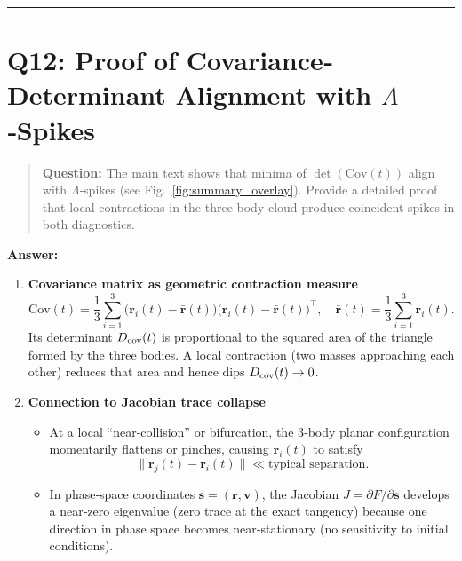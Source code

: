 \documentclass[11pt]{article}
\begin{document}
\vspace{1em}
\hrule

\section*{Q12: Proof of Covariance‐Determinant Alignment with $\Lambda$‐Spikes}
\begin{quote}
\textbf{Question:} The main text shows that minima of $\det(\mathrm{Cov}(t))$ align with $\Lambda$‐spikes (see Fig.~\ref{fig:summary_overlay}). Provide a detailed proof that local contractions in the three‐body cloud produce coincident spikes in both diagnostics.
\end{quote}

\noindent\textbf{Answer:}  
\begin{enumerate}[itemsep=0.5em]
  \item \textbf{Covariance matrix as geometric contraction measure}  
    \[
      \mathrm{Cov}(t)=\frac{1}{3}\sum_{i=1}^3 \bigl(\mathbf r_i(t) - \bar{\mathbf r}(t)\bigr)\bigl(\mathbf r_i(t) - \bar{\mathbf r}(t)\bigr)^\top,
      \quad \bar{\mathbf r}(t) = \frac{1}{3}\sum_{i=1}^3 \mathbf r_i(t).
    \]
    Its determinant $D_{\rm cov}(t)$ is proportional to the squared area of the triangle formed by the three bodies.  A local contraction (two masses approaching each other) reduces that area and hence dips $D_{\rm cov}(t)\to0$.  

  \item \textbf{Connection to Jacobian trace collapse}  
    \begin{itemize}[itemsep=0.25em]
      \item At a local “near‐collision” or bifurcation, the 3‐body planar configuration momentarily flattens or pinches, causing $\mathbf r_i(t)$ to satisfy 
        \[
          \|\mathbf r_j(t) - \mathbf r_i(t)\| \ll \text{typical separation}.
        \]
      \item In phase‐space coordinates $\mathbf s=(\mathbf r,\mathbf v)$, the Jacobian $J=\partial F/\partial \mathbf s$ develops a near‐zero eigenvalue (zero trace at the exact tangency) because one direction in phase space becomes near‐stationary (no sensitivity to initial conditions).  
    \end{itemize}


\end{enumerate}
\end{document}
